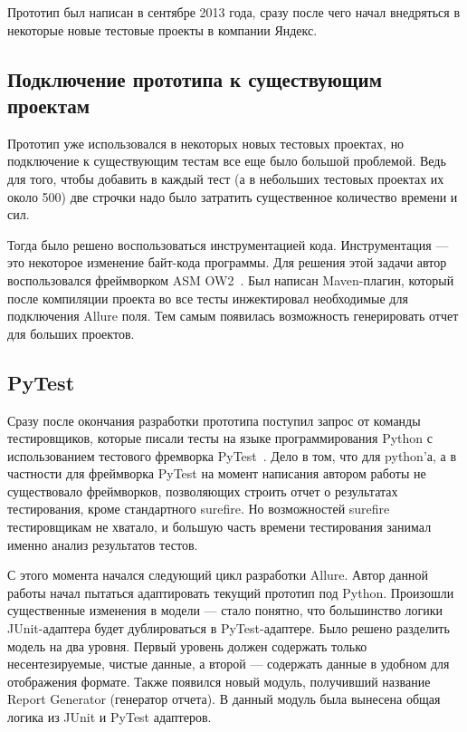Прототип был написан в сентябре 2013 года, сразу после чего начал внедряться в некоторые новые тестовые проекты в компании Яндекс.

\subsection{Подключение прототипа к существующим проектам}

Прототип уже использовался в некоторых новых тестовых проектах, но подключение к существующим тестам все еще было большой проблемой. Ведь для того, чтобы добавить в каждый тест (а в небольших тестовых проектах их около 500) две строчки надо было затратить существенное количество времени и сил. 

Тогда было решено воспользоваться инструментацией кода. Инструментация --- это некоторое изменение байт-кода программы. Для решения этой задачи автор воспользовался фреймворком ASM OW2~\cite{ow2_asm_home}. Был написан Maven-плагин, который после компиляции проекта во все тесты инжектировал необходимые для подключения Allure поля. Тем самым появилась возможность генерировать отчет для больших проектов.

\subsection{PyTest}

Сразу после окончания разработки прототипа поступил запрос от команды тестировщиков, которые писали тесты на языке программирования Python с использованием тестового фремворка PyTest~\cite{pytest_home}. Дело в том, что для python'а, а в частности для фреймворка PyTest на момент написания автором работы не существовало фреймворков, позволяющих строить отчет о результатах тестирования, кроме стандартного surefire. Но возможностей surefire тестировщикам не хватало, и большую часть времени тестирования занимал именно анализ результатов тестов.

С этого момента начался следующий цикл разработки Allure. Автор данной работы начал пытаться адаптировать текущий прототип под Python. Произошли существенные изменения в модели --- стало понятно, что большинство логики JUnit-адаптера будет дублироваться в PyTest-адаптере.
Было решено разделить модель на два уровня. Первый уровень должен содержать только несентезируемые, чистые данные, а второй --- содержать данные в удобном для отображения формате. Также появился новый модуль, получивший название Report Generator (генератор отчета). В данный модуль была вынесена общая логика из JUnit и PyTest адаптеров.

